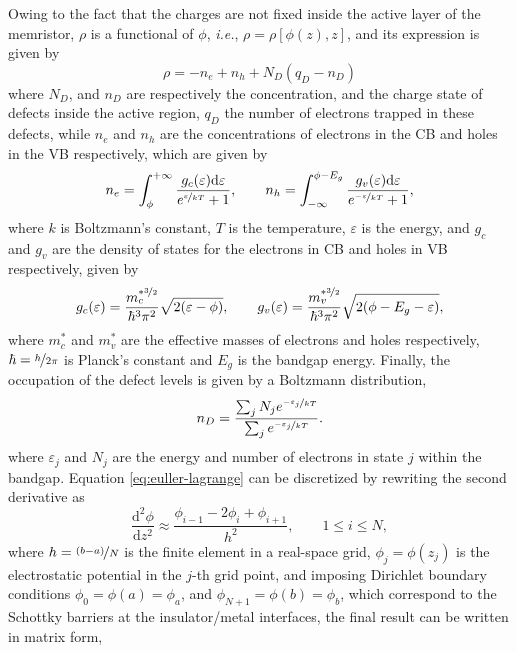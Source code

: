 Owing to the fact that the charges are not fixed inside the active layer of the memristor, $\rho$ is a functional of $\phi$, \textit{i.e.}, $\rho = \rho[\phi(z),z]$, and its expression is given by
\begin{equation}
	\rho = -n_e + n_h + N_D(q_D - n_D)
	\label{eq:charge-density}
\end{equation}
where $N_D$, and $n_D$ are respectively the concentration, and the charge state of defects inside the active region, $q_D$ the number of electrons trapped in these defects, while $n_e$ and $n_h$ are the concentrations of electrons in the CB and holes in the VB respectively, which are given by
\begin{equation}
	n_e = \int_{\phi}^{+\infty} \frac{g_c(\varepsilon)\mathrm{d}\varepsilon}{e^{\nicefrac{\varepsilon}{kT}}+1}, \qquad
	n_h = \int_{-\infty}^{\phi-E_g} \frac{g_v(\varepsilon)\mathrm{d}\varepsilon}{e^{\nicefrac{-\varepsilon}{kT}}+1},
	\label{eq:e-h-dens}
\end{equation}
where $k$ is Boltzmann's constant, $T$ is the temperature, $\varepsilon$ is the energy, and $g_c$ and $g_v$ are the density of states for the electrons in CB and holes in VB respectively, given by
\begin{equation}
	g_c(\varepsilon) = \frac{m_c^{*\nicefrac{3}{2}}}{\hbar^3 \pi^2}\sqrt{2(\varepsilon-\phi)}, \qquad
	g_v(\varepsilon) = \frac{m_v^{*\nicefrac{3}{2}}}{\hbar^3 \pi^2}\sqrt{2(\phi-E_g-\varepsilon)},
\end{equation}
where $m_c^*$ and $m_v^*$ are the effective masses of electrons and holes respectively, $\hbar = \nicefrac{h}{2\pi}$ is Planck's constant and $E_g$ is the bandgap energy. Finally, the occupation of the defect levels is given by a Boltzmann distribution,
\begin{equation}
	n_D = \frac{\sum_j N_j e^{\nicefrac{-\varepsilon_j}{kT}}}{\sum_j e^{\nicefrac{-\varepsilon_j}{kT}}}.
\end{equation}
where $\varepsilon_j$ and $N_j$ are the energy and number of electrons in state $j$ within the bandgap. Equation \ref{eq:euller-lagrange} can be discretized by rewriting the second derivative as
\begin{equation}
	\frac{\mathrm{d}^2 \phi}{\mathrm{d}z^2} \approx \frac{\phi_{i-1}-2\phi_i+\phi_{i+1}}{h^2}, \qquad 1 \leq i \leq N,
\end{equation}
where $h = \nicefrac{(b-a)}{N}$ is the finite element in a real-space grid, $\phi_j = \phi(z_j)$ is the electrostatic potential in the $j$-th grid point, and imposing Dirichlet boundary conditions $\phi_0 = \phi(a) = \phi_a$, and $\phi_{N+1} = \phi(b) = \phi_b$, which correspond to the Schottky barriers at the insulator/metal interfaces, the final result can be written in matrix form,
